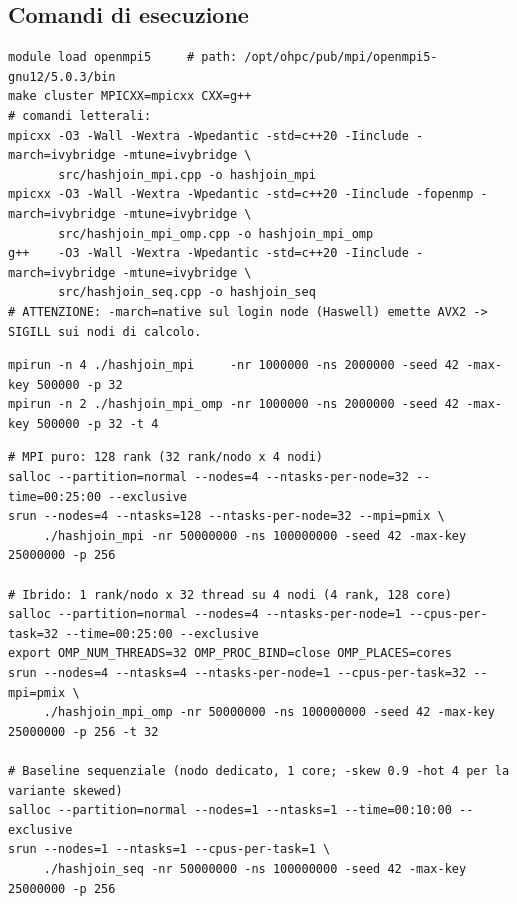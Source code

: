 \documentclass[11pt,a4paper]{article}
\begin{document}
\subsection{Comandi di esecuzione}

\begin{lstlisting}[style=bash, caption={Build cluster: -march=ivybridge OBBLIGATORIO (nodi di calcolo Ivy Bridge, no AVX2).}]
module load openmpi5     # path: /opt/ohpc/pub/mpi/openmpi5-gnu12/5.0.3/bin
make cluster MPICXX=mpicxx CXX=g++
# comandi letterali:
mpicxx -O3 -Wall -Wextra -Wpedantic -std=c++20 -Iinclude -march=ivybridge -mtune=ivybridge \
       src/hashjoin_mpi.cpp -o hashjoin_mpi
mpicxx -O3 -Wall -Wextra -Wpedantic -std=c++20 -Iinclude -fopenmp -march=ivybridge -mtune=ivybridge \
       src/hashjoin_mpi_omp.cpp -o hashjoin_mpi_omp
g++    -O3 -Wall -Wextra -Wpedantic -std=c++20 -Iinclude -march=ivybridge -mtune=ivybridge \
       src/hashjoin_seq.cpp -o hashjoin_seq
# ATTENZIONE: -march=native sul login node (Haswell) emette AVX2 -> SIGILL sui nodi di calcolo.
\end{lstlisting}

\begin{lstlisting}[style=bash, caption={Run locale e CLI (-nr -ns -seed -max-key -p [-t] [-skew -hot]).}]
mpirun -n 4 ./hashjoin_mpi     -nr 1000000 -ns 2000000 -seed 42 -max-key 500000 -p 32
mpirun -n 2 ./hashjoin_mpi_omp -nr 1000000 -ns 2000000 -seed 42 -max-key 500000 -p 32 -t 4
\end{lstlisting}

\begin{lstlisting}[style=bash, caption={Sul cluster: strong scaling NR=50M, NS=100M, P=256.}]
# MPI puro: 128 rank (32 rank/nodo x 4 nodi)
salloc --partition=normal --nodes=4 --ntasks-per-node=32 --time=00:25:00 --exclusive
srun --nodes=4 --ntasks=128 --ntasks-per-node=32 --mpi=pmix \
     ./hashjoin_mpi -nr 50000000 -ns 100000000 -seed 42 -max-key 25000000 -p 256

# Ibrido: 1 rank/nodo x 32 thread su 4 nodi (4 rank, 128 core)
salloc --partition=normal --nodes=4 --ntasks-per-node=1 --cpus-per-task=32 --time=00:25:00 --exclusive
export OMP_NUM_THREADS=32 OMP_PROC_BIND=close OMP_PLACES=cores
srun --nodes=4 --ntasks=4 --ntasks-per-node=1 --cpus-per-task=32 --mpi=pmix \
     ./hashjoin_mpi_omp -nr 50000000 -ns 100000000 -seed 42 -max-key 25000000 -p 256 -t 32

# Baseline sequenziale (nodo dedicato, 1 core; -skew 0.9 -hot 4 per la variante skewed)
salloc --partition=normal --nodes=1 --ntasks=1 --time=00:10:00 --exclusive
srun --nodes=1 --ntasks=1 --cpus-per-task=1 \
     ./hashjoin_seq -nr 50000000 -ns 100000000 -seed 42 -max-key 25000000 -p 256
\end{lstlisting}
\end{document}
